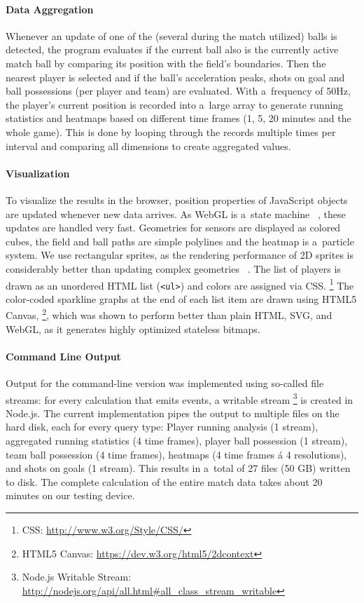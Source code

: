 \documentclass{sig-alternate}
\newcommand{\inlinelistingsize}{\fontsize{8pt}{11pt}}
\let\oldurl\url
\renewcommand{\url}[1]{\inlinelistingsize\oldurl{#1}}
\begin{document}
\paragraph{Data Aggregation}

Whenever an update of one of the (several during the match utilized) balls is detected,
the program evaluates if the current ball also is the currently active match ball
by comparing its position with the field's boundaries.
Then the nearest player is selected
and if the ball's acceleration peaks,
shots on goal and ball possessions
(per player and team) are evaluated.
With a~frequency of 50Hz, the player's current position
is recorded into a~large array to generate running statistics
and heatmaps based on different time frames
(1, 5, 20 minutes and the whole game).
This is done by looping through the records
multiple times per interval
and comparing all dimensions to create aggregated values.

\paragraph{Visualization}

To visualize the results in the browser,
position properties of JavaScript objects are updated
whenever new data arrives.
As WebGL is a~state machine%
~\cite{cantor2012webgl},
these updates are handled very fast.
Geometries for sensors are displayed as colored cubes,
the field and ball paths are simple polylines
and the heatmap is a~particle system.
We use rectangular sprites, as the rendering performance
of 2D sprites is considerably better than updating complex geometries%
~\cite{hoetzlein2012graphics}.
The list of players is drawn as an unordered HTML list (\texttt{<ul>})
and colors are assigned via CSS.%
\footnote{CSS: \url{http://www.w3.org/Style/CSS/}}
The color-coded sparkline graphs at the end of each list item
are drawn using HTML5 Canvas,%
\footnote{HTML5 Canvas: \url{https://dev.w3.org/html5/2dcontext}},
which was shown to perform better than plain HTML,
SVG, and WebGL, as it generates highly optimized stateless bitmaps.

\paragraph{Command Line Output}

Output for the command-line version was implemented
using so-called file streams: for every calculation that emits events,
a writable stream%
\footnote{Node.js Writable Stream: \url{http://nodejs.org/api/all.html\#all_class_stream_writable}}
is created in Node.js.
The current implementation pipes the output to multiple files
on the hard disk, each for every query type:
Player running analysis (1 stream),
aggregated running statistics (4 time frames),
player ball possession (1 stream),
team ball possession (4 time frames),
heatmaps (4 time frames á 4 resolutions), and shots on goals (1 stream).
This results in a~total of 27 files (50 GB) written to disk.
The complete calculation of the entire match data
takes about 20 minutes on our testing device.
\end{document}
